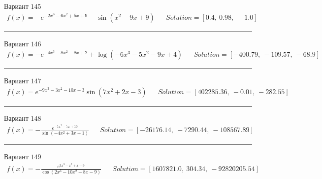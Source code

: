 \documentclass[11pt]{report}
\begin{document}
Вариант \(145\)
\begin{align*}
    f(x) = - e^{- 2 x^{3} - 6 x^{2} + 5 x + 9} - \sin{\left(x^{2} - 9 x + 9 \right)} && Solution = \left[ 0.4, \  0.98, \  -1.0\right]
\end{align*}
\begin{center}
    \noindent\rule{8cm}{0.4pt}
\end{center}
Вариант \(146\)
\begin{align*}
    f(x) = - e^{- 4 x^{3} - 8 x^{2} - 8 x + 2} + \log{\left(- 6 x^{3} - 5 x^{2} - 9 x + 4 \right)} && Solution = \left[ -400.79, \  -109.57, \  -68.9\right]
\end{align*}
\begin{center}
    \noindent\rule{8cm}{0.4pt}
\end{center}
Вариант \(147\)
\begin{align*}
    f(x) = e^{- 9 x^{3} - 3 x^{2} - 10 x - 3} \sin{\left(7 x^{2} + 2 x - 3 \right)} && Solution = \left[ 402285.36, \  -0.01, \  -282.55\right]
\end{align*}
\begin{center}
    \noindent\rule{8cm}{0.4pt}
\end{center}
Вариант \(148\)
\begin{align*}
    f(x) = - \frac{e^{- 7 x^{2} - 7 x + 10}}{\sin{\left(- 4 x^{2} + 3 x + 1 \right)}} && Solution = \left[ -26176.14, \  -7290.44, \  -108567.89\right]
\end{align*}
\begin{center}
    \noindent\rule{8cm}{0.4pt}
\end{center}
Вариант \(149\)
\begin{align*}
    f(x) = - \frac{e^{3 x^{3} - x^{2} + x - 9}}{\cos{\left(2 x^{3} - 10 x^{2} + 8 x - 9 \right)}} && Solution = \left[ 1607821.0, \  304.34, \  -92820205.54\right]
\end{align*}
\end{document}
